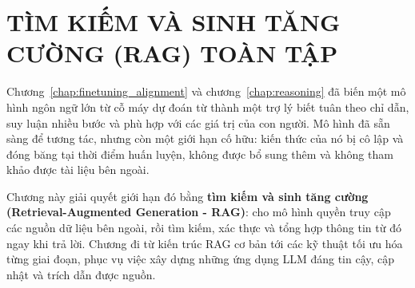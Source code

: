 \chapter{TÌM KIẾM VÀ SINH TĂNG CƯỜNG (RAG) TOÀN TẬP}
\label{chap:rag}

Chương~\ref{chap:finetuning_alignment} và chương~\ref{chap:reasoning} đã biến một mô hình ngôn ngữ lớn từ cỗ máy dự đoán từ thành một trợ lý biết tuân theo chỉ dẫn, suy luận nhiều bước và phù hợp với các giá trị của con người. Mô hình đã sẵn sàng để tương tác, nhưng còn một giới hạn cố hữu: kiến thức của nó bị cô lập và đóng băng tại thời điểm huấn luyện, không được bổ sung thêm và không tham khảo được tài liệu bên ngoài.

Chương này giải quyết giới hạn đó bằng \textbf{tìm kiếm và sinh tăng cường (Retrieval-Augmented Generation - RAG)}: cho mô hình quyền truy cập các nguồn dữ liệu bên ngoài, rồi tìm kiếm, xác thực và tổng hợp thông tin từ đó ngay khi trả lời. Chương đi từ kiến trúc RAG cơ bản tới các kỹ thuật tối ưu hóa từng giai đoạn, phục vụ việc xây dựng những ứng dụng LLM đáng tin cậy, cập nhật và trích dẫn được nguồn.
